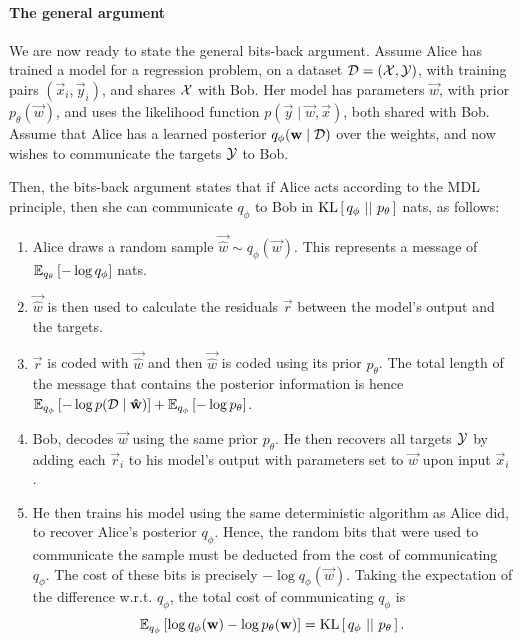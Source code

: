 \paragraph{The general argument}
We are now ready to state the general bits-back argument. Assume Alice has
trained a model for a regression problem, on a dataset $\Data = (\X, \Y)$, with
training pairs $(\vec{x}_i, \vec{y}_i)$, and shares $\X$ with Bob. Her model has
parameters $\vec{w}$, with prior $p_\theta(\vec{w})$, and uses the likelihood
function $p(\vec{y} \mid \vec{w}, \vec{x})$, both shared with Bob. Assume that
Alice has a learned posterior $q_\phi(\vec{w} \mid \Data)$ over the weights, and now
wishes to communicate the targets $\Y$ to Bob.
\par
Then, the bits-back argument states that if Alice acts according to the MDL
principle, then she can communicate $q_\phi$ to Bob in $\KL{q_\phi}{p_\theta}$
nats, as follows:
\begin{enumerate}
\item Alice draws a random sample $\vec{\hat{w}} \sim q_{\phi}(\vec{w})$. This
  represents a message of $\Exp{- \log q_\phi}{q_\theta}$ nats.
\item $\vec{\hat{w}}$ is then used to calculate the residuals $\vec{r}$ between
  the model's output and the targets.
\item $\vec{r}$ is coded with $\vec{\hat{w}}$ and then $\vec{\hat{w}}$ is coded
  using its prior $p_\theta$. The total length of the message that contains
  the posterior information is hence $\Exp{-\log p(\Data \mid
    \vec{\hat{w}})}{q_\phi} + \Exp{-\log p_{\theta}}{q_\phi}$.
\item Bob, decodes $\vec{w}$ using the same prior $p_\theta$. He then
  recovers all targets $\Y$ by adding each $\vec{r}_i$ to his model's output with
  parameters set to $\vec{w}$ upon input $\vec{x}_i$.
\item He then trains his model using the same deterministic algorithm as Alice
  did, to recover Alice's posterior $q_\phi$. Hence, the random bits that were
  used to communicate the sample must be deducted from the cost of
  communicating $q_\phi$. The cost of these bits is precisely $-\log
  q_\phi(\vec{w})$. Taking the expectation of the difference w.r.t. $q_\phi$,
  the total cost of communicating $q_\phi$ is
  \[
    \Exp{\log q_\phi(\vec{w}) - \log p_\theta(\vec{w})}{q_\phi} = \KL{q_\phi}{p_\theta}.
  \]
\end{enumerate}

